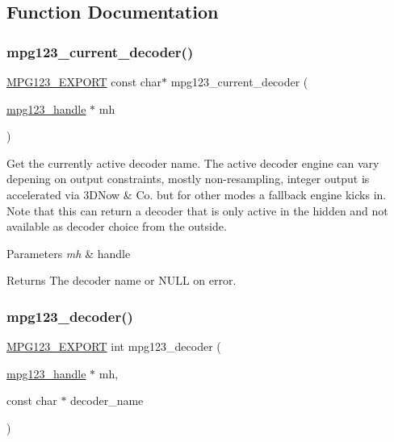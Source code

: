 \subsection{Function Documentation}
\mbox{\label{group__mpg123__decoder_gaa9e1be14b204d271ab57b679894c10e2}} 
\subsubsection{\texorpdfstring{mpg123\_current\_decoder()}{mpg123\_current\_decoder()}}
{\footnotesize\ttfamily \mbox{\hyperlink{mpg123_8h_a2ba98cfba3f760879df70e755b2a61cc}{M\+P\+G123\+\_\+\+E\+X\+P\+O\+RT}} const char$\ast$ mpg123\+\_\+current\+\_\+decoder (\begin{DoxyParamCaption}\item[{\mbox{\hyperlink{group__mpg123__init_ga6728e2839a395f3a07d4514da659faca}{mpg123\+\_\+handle}} $\ast$}]{mh }\end{DoxyParamCaption})}

Get the currently active decoder name. The active decoder engine can vary depening on output constraints, mostly non-\/resampling, integer output is accelerated via 3D\+Now \& Co. but for other modes a fallback engine kicks in. Note that this can return a decoder that is only active in the hidden and not available as decoder choice from the outside. 
\begin{DoxyParams}{Parameters}
{\em mh} & handle \\
\hline
\end{DoxyParams}
\begin{DoxyReturn}{Returns}
The decoder name or N\+U\+LL on error. 
\end{DoxyReturn}
\mbox{\label{group__mpg123__decoder_gae21df3e432dc90e9983d9fea25372cdc}} 
\subsubsection{\texorpdfstring{mpg123\_decoder()}{mpg123\_decoder()}}
{\footnotesize\ttfamily \mbox{\hyperlink{mpg123_8h_a2ba98cfba3f760879df70e755b2a61cc}{M\+P\+G123\+\_\+\+E\+X\+P\+O\+RT}} int mpg123\+\_\+decoder (\begin{DoxyParamCaption}\item[{\mbox{\hyperlink{group__mpg123__init_ga6728e2839a395f3a07d4514da659faca}{mpg123\+\_\+handle}} $\ast$}]{mh,  }\item[{const char $\ast$}]{decoder\+\_\+name }\end{DoxyParamCaption})}

